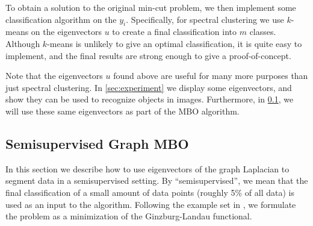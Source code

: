 \documentclass[journal]{IEEEtran}
\begin{document}
To obtain a solution to the original min-cut problem, we then implement some
classification algorithm on the $y_i$. Specifically, for spectral clustering we
use $k$-means on the eigenvectors $u$ to create a final classification into $m$
classes. Although $k$-means is unlikely to give an optimal classification, it is
quite easy to implement, and the final results are strong enough to give a
proof-of-concept.

Note that the eigenvectors $u$ found above are useful for many more purposes
than just spectral clustering. In \ref{sec:experiment} we display some
eigenvectors, and show they can be used to recognize objects in
images. Furthermore, in \ref{sec:MBO}, we will use these same eigenvectors as
part of the MBO algorithm.

\subsection{Semisupervised Graph MBO}\label{sec:MBO}


In this section we describe how to use eigenvectors of the graph Laplacian to
segment data in a semisupervised setting. By ``semisupervised'', we mean that
the final classification of a small amount of data points (roughly 5\% of all
data) is used as an input to the algorithm. Following the example set in
\cite{Garcia2014,Merkurjev13,MERKURJEV201429}, we formulate the problem as a
minimization of the Ginzburg-Landau functional.
\end{document}
